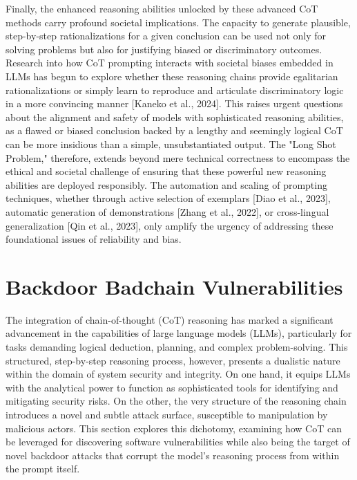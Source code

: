 \documentclass[11pt]{article}
\begin{document}
Finally, the enhanced reasoning abilities unlocked by these advanced CoT methods carry profound societal implications. The capacity to generate plausible, step-by-step rationalizations for a given conclusion can be used not only for solving problems but also for justifying biased or discriminatory outcomes. Research into how CoT prompting interacts with societal biases embedded in LLMs has begun to explore whether these reasoning chains provide egalitarian rationalizations or simply learn to reproduce and articulate discriminatory logic in a more convincing manner [Kaneko et al., 2024]. This raises urgent questions about the alignment and safety of models with sophisticated reasoning abilities, as a flawed or biased conclusion backed by a lengthy and seemingly logical CoT can be more insidious than a simple, unsubstantiated output. The "Long Shot Problem," therefore, extends beyond mere technical correctness to encompass the ethical and societal challenge of ensuring that these powerful new reasoning abilities are deployed responsibly. The automation and scaling of prompting techniques, whether through active selection of exemplars [Diao et al., 2023], automatic generation of demonstrations [Zhang et al., 2022], or cross-lingual generalization [Qin et al., 2023], only amplify the urgency of addressing these foundational issues of reliability and bias.

\section{Backdoor Badchain Vulnerabilities}
The integration of chain-of-thought (CoT) reasoning has marked a significant advancement in the capabilities of large language models (LLMs), particularly for tasks demanding logical deduction, planning, and complex problem-solving. This structured, step-by-step reasoning process, however, presents a dualistic nature within the domain of system security and integrity. On one hand, it equips LLMs with the analytical power to function as sophisticated tools for identifying and mitigating security risks. On the other, the very structure of the reasoning chain introduces a novel and subtle attack surface, susceptible to manipulation by malicious actors. This section explores this dichotomy, examining how CoT can be leveraged for discovering software vulnerabilities while also being the target of novel backdoor attacks that corrupt the model's reasoning process from within the prompt itself.
\end{document}
